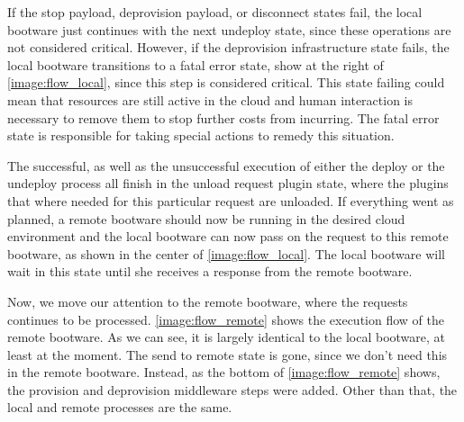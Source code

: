 If the stop payload, deprovision payload, or disconnect states fail, the local bootware just continues with the next undeploy state, since these operations are not considered critical.
However, if the deprovision infrastructure state fails, the local bootware transitions to a fatal error state, show at the right of \autoref{image:flow_local}, since this step is considered critical.
This state failing could mean that resources are still active in the cloud and human interaction is necessary to remove them to stop further costs from incurring.
The fatal error state is responsible for taking special actions to remedy this situation.

The successful, as well as the unsuccessful execution of either the deploy or the undeploy process all finish in the unload request plugin state, where the plugins that where needed for this particular request are unloaded.
If everything went as planned, a remote bootware should now be running in the desired cloud environment and the local bootware can now pass on the request to this remote bootware, as shown in the center of \autoref{image:flow_local}.
The local bootware will wait in this state until she receives a response from the remote bootware.

Now, we move our attention to the remote bootware, where the requests continues to be processed.
\autoref{image:flow_remote} shows the execution flow of the remote bootware.
As we can see, it is largely identical to the local bootware, at least at the moment.
The send to remote state is gone, since we don't need this in the remote bootware.
Instead, as the bottom of \autoref{image:flow_remote} shows, the provision and deprovision middleware steps were added.
Other than that, the local and remote processes are the same.

